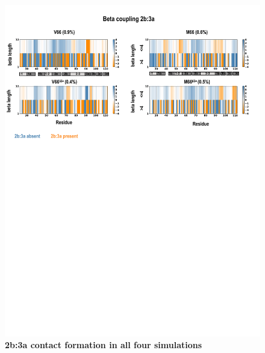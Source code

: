 \documentclass[journal=jacsat,manuscript=article]{achemso}
\begin{document}
\begin{figure}[!ht]
\includegraphics[scale=0.5,width=12cm,trim={0 0cm 0 0cm},clip]{../figures/coupling_4.pdf}
\caption{{\bf 2b:3a contact formation in all four simulations}
 }
\label{fig6}
\end{figure}
\end{document}
